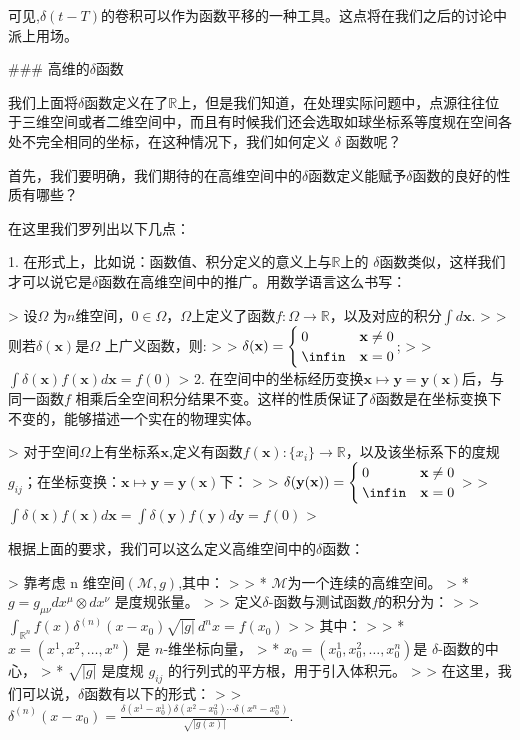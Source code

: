\documentclass[lang=cn,10pt,newtx,bibend=biber,device=pad]{elegantbook}
\begin{document}
可见,$\delta(t-T)$的卷积可以作为函数平移的一种工具。这点将在我们之后的讨论中派上用场。

### 高维的$\delta$函数

我们上面将$\delta$函数定义在了$\mathbb{R}$上，但是我们知道，在处理实际问题中，点源往往位于三维空间或者二维空间中，而且有时候我们还会选取如球坐标系等度规在空间各处不完全相同的坐标，在这种情况下，我们如何定义 $\delta$ 函数呢？

首先，我们要明确，我们期待的在高维空间中的$\delta$函数定义能赋予$\delta$函数的良好的性质有哪些？

在这里我们罗列出以下几点：

1. 在形式上，比如说：函数值、积分定义的意义上与$\mathbb{R}$上的 $\delta$函数类似，这样我们才可以说它是$\delta$函数在高维空间中的推广。用数学语言这么书写：

    > 设$\Omega$ 为$n$维空间，$0 \in\Omega $，$\Omega$上定义了函数$f:\Omega\to\mathbb{R}$，以及对应的积分$\int d\mathbf{x}$.
    >
    > 则若$\delta(\mathbf{x})$是$\Omega$ 上广义函数，则:
    >
    > $\delta(\mathbf{x})= \begin{cases} 0&\mathbf{x}\neq0\\ \infin&\mathbf{x}=0 \end{cases}$;
    >
    > $\int \delta(\mathbf{x})f(\mathbf{x})d\mathbf{x} = f(0)$  
    >
2. 在空间中的坐标经历变换$\mathbf{x} \mapsto \mathbf{y} = \mathbf{y}(\mathbf{x})$后，与同一函数$f$ 相乘后全空间积分结果不变。这样的性质保证了$\delta$函数是在坐标变换下不变的，能够描述一个实在的物理实体。

    > 对于空间$\Omega$上有坐标系$\mathbf{x}$,定义有函数$f(\mathbf{x}):\{x_i\}\to\mathbb{R}$，以及该坐标系下的度规$g_{ij}$；在坐标变换：$\mathbf{x} \mapsto \mathbf{y} = \mathbf{y}(\mathbf{x})$下：
    >
    > $\delta(\mathbf{y}(\mathbf{x}))=\begin{cases} 0&\mathbf{x}\neq0\\ \infin&\mathbf{x}=0 \end{cases}$  
    >
    > $\int \delta(\mathbf{x})f(\mathbf{x})d\mathbf{x} = \int \delta(\mathbf{y})f(\mathbf{y})d\mathbf{y} = f(0)$  
    >

根据上面的要求，我们可以这么定义高维空间中的$\delta$函数：

> 靠考虑 n 维空间$(\mathcal{M}, g)$,其中：
>
> * $\mathcal{M}$为一个连续的高维空间。
> * $g = g_{\mu\nu} dx^\mu \otimes dx^\nu$ 是度规张量。
>
> 定义$\delta$-函数与测试函数$f$的积分为：
>
> $ \int_{\mathbb{R}^n} f(x) \delta^{(n)}(x - x_0) \sqrt{|g|} \, d^n x = f(x_0)$
>
> 其中：
>
> * $x = (x^1, x^2, \ldots, x^n)$ 是 $n$-维坐标向量，
> * $x_0 = (x_0^1, x_0^2, \ldots, x_0^n)$是 $\delta$-函数的中心，
> * $\sqrt{|g|}$ 是度规 $g_{ij}$ 的行列式的平方根，用于引入体积元。
>
> 在这里，我们可以说，$\delta$函数有以下的形式：
>
> $ \delta^{(n)}(x - x_0) = \frac{\delta(x^1 - x_0^1) \delta(x^2 - x_0^2) \cdots \delta(x^n - x_0^n)}{\sqrt{|g(x)|}}. $
\end{document}
